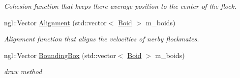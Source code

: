 \begin{DoxyCompactItemize}
\begin{DoxyCompactList}\small\item\em Cohesion function that keeps there average position to the center of the flock. \end{DoxyCompactList}\item 
\hypertarget{classBoid_a53c521d38a0df790cdaa7b29d4c80dd2}{
ngl::Vector \hyperlink{classBoid_a53c521d38a0df790cdaa7b29d4c80dd2}{Alignment} (std::vector$<$ \hyperlink{classBoid}{Boid} $>$ m\_\-boids)}
\label{classBoid_a53c521d38a0df790cdaa7b29d4c80dd2}

\begin{DoxyCompactList}\small\item\em Alignment function that aligns the velocities of nerby flockmates. \end{DoxyCompactList}\item 
ngl::Vector \hyperlink{classBoid_a1c1b01368b2a993f6ac60d4bc9297058}{BoundingBox} (std::vector$<$ \hyperlink{classBoid}{Boid} $>$ m\_\-boids)
\begin{DoxyCompactList}\small\item\em draw method \end{DoxyCompactList}\end{DoxyCompactItemize}
